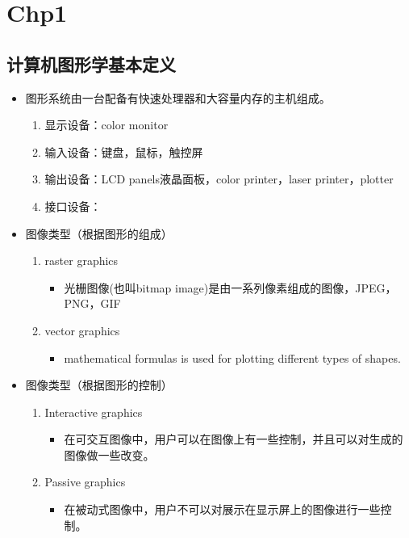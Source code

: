 \documentclass[UTF8]{ctexart}
\begin{document}
\section{Chp1}
\subsection{计算机图形学基本定义}
\begin{itemize}
    \item 图形系统由一台配备有快速处理器和大容量内存的主机组成。
    \begin{enumerate}
        \item 显示设备：color monitor
        \item 输入设备：键盘，鼠标，触控屏
        \item 输出设备：LCD panels液晶面板，color printer，laser printer，plotter
        \item 接口设备：
    \end{enumerate}
    \item 图像类型（根据图形的组成）
    \begin{enumerate}
        \item raster graphics
        \begin{itemize}
            \item 光栅图像(也叫bitmap image)是由一系列像素组成的图像，JPEG，PNG，GIF
        \end{itemize}
        \item vector graphics
        \begin{itemize}
            \item mathematical formulas is used for plotting different types of shapes.
        \end{itemize}
    \end{enumerate}
    \item 图像类型（根据图形的控制）
        \begin{enumerate}
        \item Interactive graphics
        \begin{itemize}
            \item 在可交互图像中，用户可以在图像上有一些控制，并且可以对生成的图像做一些改变。
        \end{itemize}
        \item Passive graphics
        \begin{itemize}
            \item 在被动式图像中，用户不可以对展示在显示屏上的图像进行一些控制。
        \end{itemize}

\end{enumerate}
\end{itemize}
\end{document}
